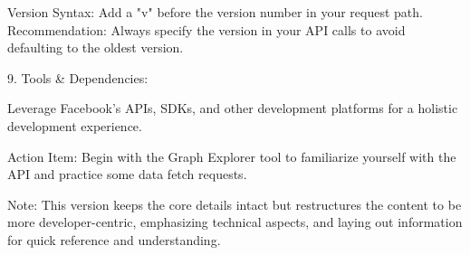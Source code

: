     Version Syntax: Add a "v" before the version number in your request path.
    Recommendation: Always specify the version in your API calls to avoid defaulting to the oldest version.

9. Tools & Dependencies:

Leverage Facebook's APIs, SDKs, and other development platforms for a holistic development experience.

Action Item: Begin with the Graph Explorer tool to familiarize yourself with the API and practice some data fetch requests.

Note: This version keeps the core details intact but restructures the content to be more developer-centric, emphasizing technical aspects, and laying out information for quick reference and understanding.